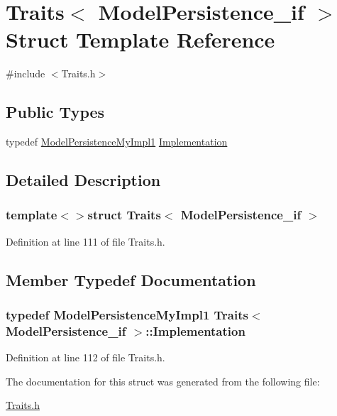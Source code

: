 \hypertarget{struct_traits_3_01_model_persistence__if_01_4}{\section{Traits$<$ Model\-Persistence\-\_\-if $>$ Struct Template Reference}
\label{struct_traits_3_01_model_persistence__if_01_4}
}


{\ttfamily \#include $<$Traits.\-h$>$}

\subsection*{Public Types}
\begin{DoxyCompactItemize}
\item 
typedef \hyperlink{class_model_persistence_my_impl1}{Model\-Persistence\-My\-Impl1} \hyperlink{struct_traits_3_01_model_persistence__if_01_4_aab21a3f51580006b6926b0ee0e4d6302}{Implementation}
\end{DoxyCompactItemize}


\subsection{Detailed Description}
\subsubsection*{template$<$$>$struct Traits$<$ Model\-Persistence\-\_\-if $>$}



Definition at line 111 of file Traits.\-h.



\subsection{Member Typedef Documentation}
\hypertarget{struct_traits_3_01_model_persistence__if_01_4_aab21a3f51580006b6926b0ee0e4d6302}{
\subsubsection[{Implementation}]{\setlength{\rightskip}{0pt plus 5cm}typedef {\bf Model\-Persistence\-My\-Impl1} {\bf Traits}$<$ {\bf Model\-Persistence\-\_\-if} $>$\-::{\bf Implementation}}}\label{struct_traits_3_01_model_persistence__if_01_4_aab21a3f51580006b6926b0ee0e4d6302}


Definition at line 112 of file Traits.\-h.



The documentation for this struct was generated from the following file\-:\begin{DoxyCompactItemize}
\item 
\hyperlink{_traits_8h}{Traits.\-h}\end{DoxyCompactItemize}
